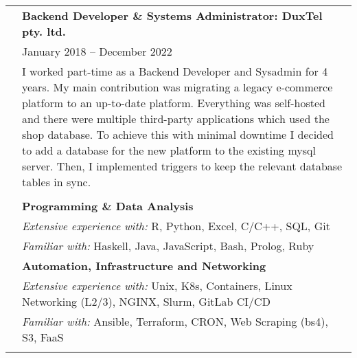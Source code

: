 \documentclass[letterpaper, 11pt]{article}
\begin{document}
\begin{longtable}{p{0.8in}p{5.4in}}
& \textbf{Backend Developer \& Systems Administrator: DuxTel pty. ltd. } \\
& \hfill January 2018 -- December 2022 \\
& I worked part-time as a Backend Developer and Sysadmin for 4 years. My main contribution was migrating a legacy e-commerce platform to an up-to-date platform. Everything was self-hosted and there were multiple third-party applications which used the shop database. To achieve this with minimal downtime I decided to add a database for the new platform to the existing mysql server. Then, I implemented triggers to keep the relevant database tables in sync.\\
& \\

{\color{OliveGreen}{Skills}} 
& \textbf{Programming \& Data Analysis}\\
& \textit{Extensive experience with: }R, Python, Excel, C/C++, SQL, Git\\
& \textit{Familiar with: }Haskell, Java, JavaScript, Bash, Prolog, Ruby\\
& \textbf{Automation, Infrastructure and Networking}\\
& \textit{Extensive experience with: }Unix, K8s, Containers, Linux Networking (L2/3), NGINX, Slurm, GitLab CI/CD\\
& \textit{Familiar with: }Ansible, Terraform, CRON, Web Scraping (bs4), S3, FaaS\\
& \\


\end{longtable}
\end{document}

